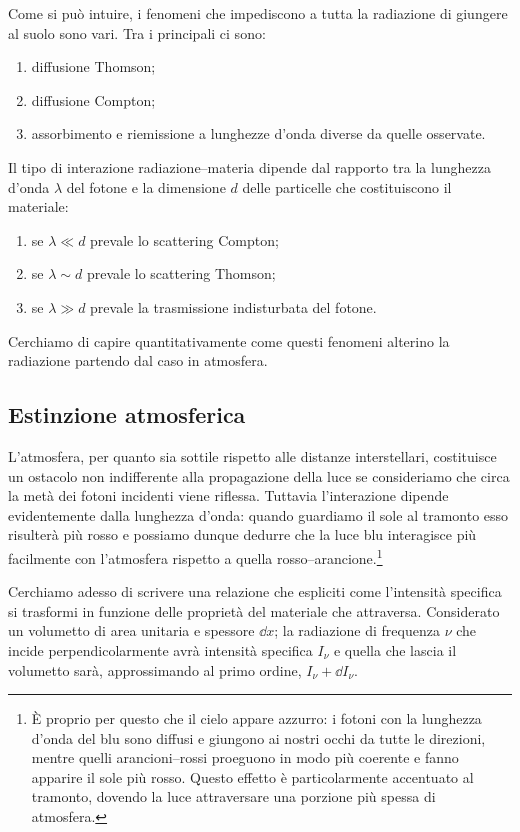     Come si può intuire, i fenomeni che impediscono a tutta la radiazione di giungere al suolo sono vari. Tra i principali ci sono:
    \begin{enumerate}[label=\ding{70}]
        \item diffusione Thomson;
        \item diffusione Compton;
        \item assorbimento e riemissione a lunghezze d'onda diverse da quelle osservate.
    \end{enumerate}
    Il tipo di interazione radiazione--materia dipende dal rapporto tra la lunghezza d'onda $\lambda$ del fotone e la dimensione $d$ delle particelle che costituiscono il materiale:
    \begin{enumerate}[label=\ding{70}]
        \item se $\lambda \ll d$ prevale lo scattering Compton;
        \item se $\lambda \sim d$ prevale lo scattering Thomson;
        \item se $\lambda \gg d$ prevale la trasmissione indisturbata del fotone. 
    \end{enumerate}
    
    Cerchiamo di capire quantitativamente come questi fenomeni alterino la radiazione partendo dal caso in atmosfera.
    \subsection{Estinzione atmosferica}\label{ss:estinzione-atmosferica}
        L'atmosfera, per quanto sia sottile rispetto alle distanze interstellari, costituisce un ostacolo non indifferente alla propagazione della luce se consideriamo che circa la metà dei fotoni incidenti viene riflessa. Tuttavia l'interazione dipende evidentemente dalla lunghezza d'onda: quando guardiamo il sole al tramonto esso risulterà più rosso e possiamo dunque dedurre che la luce blu interagisce più facilmente con l'atmosfera rispetto a quella rosso--arancione.\footnote{È proprio per questo che il cielo appare azzurro: i fotoni con la lunghezza d'onda del blu sono diffusi e giungono ai nostri occhi da tutte le direzioni, mentre quelli arancioni--rossi proeguono in modo più coerente e fanno apparire il sole più rosso. Questo effetto è particolarmente accentuato al tramonto, dovendo la luce attraversare una porzione più spessa di atmosfera.}

        Cerchiamo adesso di scrivere una relazione che espliciti come l'intensità specifica si trasformi in funzione delle proprietà del materiale che attraversa. Considerato un volumetto di area unitaria e spessore $\dd{x}$; la radiazione di frequenza $\nu$ che incide perpendicolarmente avrà intensità specifica $I_\nu$ e quella che lascia il volumetto sarà, approssimando al primo ordine, $I_\nu + \dd{I_\nu}$.

